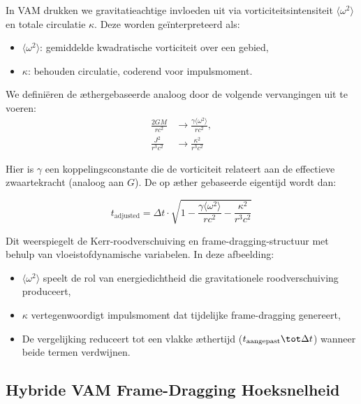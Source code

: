 In VAM drukken we gravitatieachtige invloeden uit via vorticiteitsintensiteit $\langle \omega^2 \rangle$ en totale circulatie $\kappa$. Deze worden geïnterpreteerd als:
\begin{itemize}
\item $\langle \omega^2 \rangle$: gemiddelde kwadratische vorticiteit over een gebied,
\item $\kappa$: behouden circulatie, coderend voor impulsmoment.
\end{itemize}

We definiëren de æthergebaseerde analoog door de volgende vervangingen uit te voeren:
\begin{equation}
\begin{aligned}
\frac{2GM}{rc^2} &\rightarrow \frac{\gamma \langle \omega^2 \rangle}{rc^2}, \\
\frac{J^2}{r^3c^2} &\rightarrow \frac{\kappa^2}{r^3c^2}
\end{aligned}
\label{eq:Kerr_replacements}
\end{equation}

Hier is $\gamma$ een koppelingsconstante die de vorticiteit relateert aan de effectieve zwaartekracht (analoog aan $G$). De op æther gebaseerde eigentijd wordt dan:

\begin{equation}
\boxed{t_{\text{adjusted}} = \Delta t \cdot \sqrt{1 - \frac{\gamma \langle \omega^2 \rangle}{rc^2} - \frac{\kappa^2}{r^3c^2}}}
\label{eq:Kerr_time_dilation_ae}
\end{equation}

Dit weerspiegelt de Kerr-roodverschuiving en frame-dragging-structuur met behulp van vloeistofdynamische variabelen. In deze afbeelding:
\begin{itemize}
\item $\langle \omega^2 \rangle$ speelt de rol van energiedichtheid die gravitationele roodverschuiving produceert,
\item $\kappa$ vertegenwoordigt impulsmoment dat tijdelijke frame-dragging genereert,
\item De vergelijking reduceert tot een vlakke æthertijd ($t_{\text{aangepast}} \tot \Delta t$) wanneer beide termen verdwijnen.
\end{itemize}


\subsection*{Hybride VAM Frame-Dragging Hoeksnelheid}


